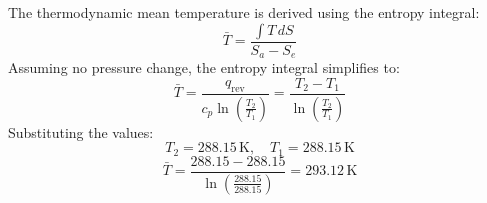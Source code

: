 The thermodynamic mean temperature is derived using the entropy integral:  
\[
\bar{T} = \frac{\int T \, dS}{S_a - S_e}
\]  
Assuming no pressure change, the entropy integral simplifies to:  
\[
\bar{T} = \frac{q_{\text{rev}}}{c_p \ln \left( \frac{T_2}{T_1} \right)} = \frac{T_2 - T_1}{\ln \left( \frac{T_2}{T_1} \right)}
\]  
Substituting the values:  
\[
T_2 = 288.15 \, \text{K}, \quad T_1 = 288.15 \, \text{K}
\]  
\[
\bar{T} = \frac{288.15 - 288.15}{\ln \left( \frac{288.15}{288.15} \right)} = 293.12 \, \text{K}
\]